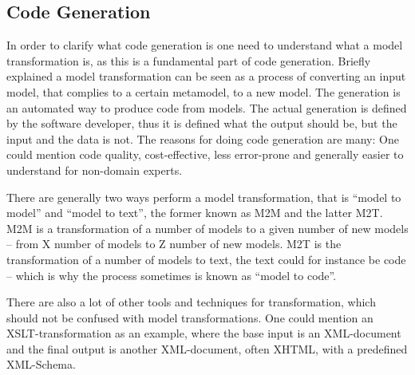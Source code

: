 \subsection{Code Generation}
\label{background-codegeneration}

In order to clarify what code generation is one need to understand what a model
transformation is, as this is a fundamental part of code generation. Briefly explained a model transformation can be seen as a process of converting an input model, that complies to a certain metamodel, to a new model. The generation is an automated way to produce code from models. The actual generation is defined by the software developer, thus it is defined what the output should be, but the input and the data is not. The reasons for doing code generation are many: One could mention code quality, cost-effective, less error-prone and generally easier to understand for non-domain experts.

There are generally two ways perform a model transformation, that is ``model to model'' and ``model to text'', the former known as M2M and the latter M2T. M2M is a transformation of a number of models to a given number of new models -- from X number of models to Z number of new models. M2T is  the transformation of a number of models to text, the text could for instance be code -- which is why the process sometimes is known as ``model to code''.

There are also a lot of other tools and techniques for transformation, which should not be confused with model transformations. One could mention an XSLT-transformation as an example, where the base input is an XML-document and the final output is
another XML-document, often XHTML, with a predefined XML-Schema.
